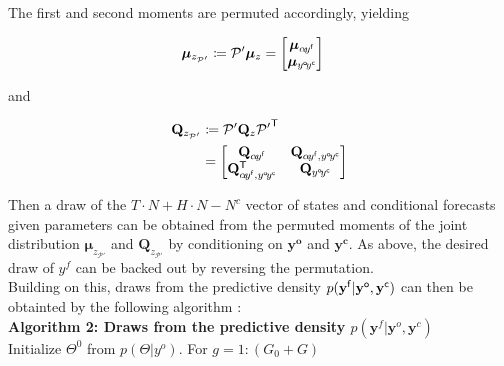 \documentclass[notitlepage,a4paper,12pt]{article}
\newcommand{\transpose}[1]{{#1}^{\sf{T}}}
\begin{document}
The first and second moments are permuted accordingly, yielding 

\begin{align*}
\boldsymbol{\mu}_{z_{\mathcal{P}'}} &\coloneqq \mathcal{P}' \boldsymbol{\mu}_z = 
\begin{bmatrix}
    \boldsymbol{\mu}_{\alpha\! y^{\sf{f}}} \\
    \boldsymbol{\mu}_{y^{\sf{o}}\!y^{\sf{c}}}
\end{bmatrix}
\end{align*}

and 

\begin{align*}
    \mathbf{Q}_{z_{\mathcal{P}'}} &\coloneqq  \mathcal{P}' \mathbf{Q}_z \transpose{\mathcal{P}'} \\
    &= 
    \begin{bmatrix}
        \mathbf{Q}_{\alpha\! y^{\sf{f}}} & \mathbf{Q}_{\alpha\! y^{\sf{f}}, y^{\sf{o}}\!y^{\sf{c}}} \\ 
        \mathbf{Q}^{\sf{T}}_{\alpha\! y^{\sf{f}}, y^{\sf{o}}\! y^{\sf{c}}} & \mathbf{Q}_{y^{\sf{o}}\!y^{\sf{c}}}
    \end{bmatrix}
\end{align*}

Then a draw of the $T\!\cdot\!N + H\!\cdot\!N - N^c$ vector of states and conditional forecasts given parameters can be obtained from the permuted moments of the joint distribution $\boldsymbol{\mu}_{z_{\mathcal{P}'}} $ and $\mathbf{Q}_{z_{\mathcal{P}'}} $ by conditioning on $\mathbf{y^{o}}$ and $\mathbf{y^c}$. As above, the desired draw of $y^f$ can be backed out by reversing the permutation.\\

Building on this, draws from the predictive density $p(\mathbf{y^{\sf{f}}}|\mathbf{y^{\sf{o}}}, \mathbf{y^{\sf{c}}})$ can then be obtainted by the following algorithm \citep[see also ][Algorithm 1]{waggonerzha1999_res}:\\

\noindent\textbf{Algorithm 2: Draws from the predictive density $p(\mathbf{y}^f | \mathbf{y}^o, \mathbf{y}^c)$}\\

Initialize $\Theta^{0}$ from $p(\Theta | y^o)$. For $g=1:(G_0+G)$
\end{document}
